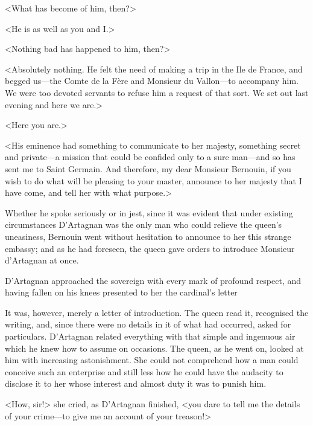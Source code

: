 <What has become of him, then?>

<He is as well as you and I.>

<Nothing bad has happened to him, then?>

<Absolutely nothing. He felt the need of making a trip in the Ile de France, and begged us—the Comte de la Fère and Monsieur du Vallon—to accompany him. We were too devoted servants to refuse him a request of that sort. We set out last evening and here we are.>

<Here you are.>

<His eminence had something to communicate to her majesty, something secret and private—a mission that could be confided only to a sure man—and so has sent me to Saint Germain. And therefore, my dear Monsieur Bernouin, if you wish to do what will be pleasing to your master, announce to her majesty that I have come, and tell her with what purpose.>

Whether he spoke seriously or in jest, since it was evident that under existing circumstances D'Artagnan was the only man who could relieve the queen's uneasiness, Bernouin went without hesitation to announce to her this strange embassy; and as he had foreseen, the queen gave orders to introduce Monsieur d'Artagnan at once.

D'Artagnan approached the sovereign with every mark of profound respect, and having fallen on his knees presented to her the cardinal's letter

It was, however, merely a letter of introduction. The queen read it, recognised the writing, and, since there were no details in it of what had occurred, asked for particulars. D'Artagnan related everything with that simple and ingenuous air which he knew how to assume on occasions. The queen, as he went on, looked at him with increasing astonishment. She could not comprehend how a man could conceive such an enterprise and still less how he could have the audacity to disclose it to her whose interest and almost duty it was to punish him.

<How, sir!> she cried, as D'Artagnan finished, <you dare to tell me the details of your crime—to give me an account of your treason!>

